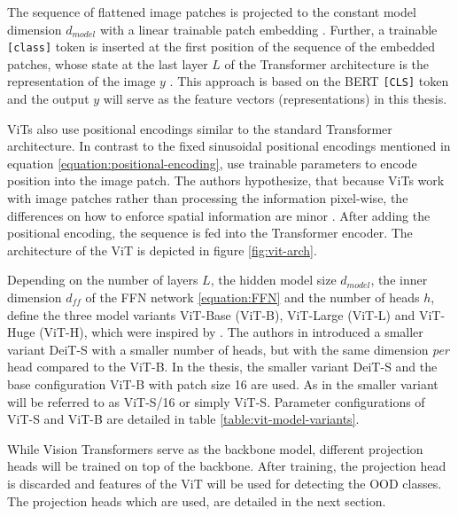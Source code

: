 The sequence of flattened image patches is projected to the constant model dimension $d_{model}$ with a linear trainable patch embedding \citep{Dosovitskiy2020,Vaswani2017}.
Further, a trainable \texttt{[class]} token is inserted at the first position of the sequence of the embedded patches, whose state at the last layer $L$ of the Transformer architecture is the representation of the image $y$ \citep{Dosovitskiy2020}.
This approach is based on the BERT \texttt{[CLS]} token \citep{Devlin2018} and the output $y$ will serve as the feature vectors (representations) in this thesis.
\par
ViTs also use positional encodings similar to the standard Transformer architecture.
In contrast to the fixed sinusoidal positional encodings mentioned in equation \ref{equation:positional-encoding}, \citep{Dosovitskiy2020} use trainable parameters to encode position into the image patch.
The authors hypothesize, that because ViTs work with image patches rather than processing the information pixel-wise, the differences on how to enforce spatial information are minor \citep{Dosovitskiy2020}.
After adding the positional encoding, the sequence is fed into the Transformer encoder.
The architecture of the ViT is depicted in figure \ref{fig:vit-arch}.
\par
Depending on the number of layers $L$, the hidden model size $d_{model}$, the inner dimension $d_{ff}$ of the FFN network \ref{equation:FFN} and the number of heads $h$, \citep{Dosovitskiy2020} define the three model variants ViT-Base (ViT-B), ViT-Large (ViT-L) and ViT-Huge (ViT-H), which were inspired by \citep{Devlin2018}.
The authors in \citep{Touvron2020} introduced a smaller variant DeiT-S with a smaller number of heads, but with the same dimension \textit{per} head compared to the ViT-B.
In the thesis, the smaller variant DeiT-S \citep{Touvron2020} and the base configuration ViT-B with patch size 16 are used.
As in \citep{Caron2021} the smaller variant will be referred to as ViT-S/16 or simply ViT-S.
Parameter configurations of ViT-S and ViT-B are detailed in table \ref{table:vit-model-variants}.
\par
While Vision Transformers serve as the backbone model, different projection heads will be trained on top of the backbone. 
After training, the projection head is discarded and features of the ViT will be used for detecting the OOD classes.
The projection heads which are used, are detailed in the next section.
